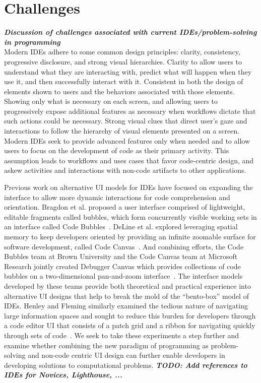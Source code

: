 \documentclass{ppig}
\newcommand{\bold}[1]{\textit{\textbf{\color{aoblue}#1}}} %
\newcommand{\todo}[1]{\textit{\textbf{\color{red}TODO: #1}}} %
\begin{document}
\section{Challenges}
\bold{Discussion of challenges associated with current IDEs/problem-solving in programming\\}
Modern IDEs adhere to some common design principles: clarity, consistency, progressive disclosure, and strong visual hierarchies.
Clarity to allow users to understand what they are interacting with, predict what will happen when they use it, and then successfully interact with it.
Consistent in both the design of elements shown to users and the behaviors associated with those elements.
Showing only what is necessary on each screen, and allowing users to progressively expose additional features as necessary when workflows dictate that such actions could be necessary.
Strong visual clues that direct user's gaze and interactions to follow the hierarchy of visual elements presented on a screen.
Modern IDEs seek to provide advanced features only when needed and to allow users to focus on the development of code as their primary activity.
This assumption leads to workflows and uses cases that favor code-centric design, and askew activities and interactions with non-code artifacts to other applications.

Previous work on alternative UI models for IDEs have focused on expanding the interface to allow more dynamic interactions for code comprehension and orientation.
Bragdon et al. proposed a user interface comprised of lightweight, editable fragments called bubbles, which form concurrently visible working sets in an interface called Code Bubbles~\cite{bragdon2010bubbles}.
DeLine et al. explored leveraging spatial memory to keep developers oriented by providing an infinite zoomable surface for software development, called Code Canvas~\cite{deline2010canvas}.
And combining efforts, the Code Bubbles team at Brown University and the Code Canvas team at Microsoft Research jointly created Debugger Canvas which provides collections of code bubbles on a two-dimensional pan-and-zoom interface~\cite{deline2012debugger}.
The interface models developed by these teams provide both theoretical and practical experience into alternative UI designs that help to break the mold of the ``bento-box'' model of IDEs.
Henley and Fleming similarly examined the tedious nature of navigating large information spaces and sought to reduce this burden for developers through a code editor UI that consists of a patch grid and a ribbon for navigating quickly through sets of code~\cite{henley2014patchworks}.
We seek to take these experiments a step further and examine whether combining the new paradigm of programming as problem-solving and non-code centric UI design can further enable developers in developing solutions to computational problems.
\todo{Add references to IDEs for Novices, Lighthouse, ...}
\end{document}

